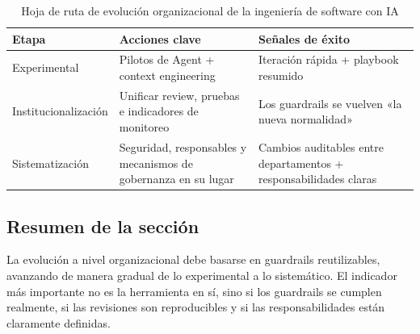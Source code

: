 \begin{table}[H]
\centering
\begin{tabular}{p{} p{} p{}}
\toprule
Etapa & Acciones clave & Señales de éxito \\
\midrule
Experimental & Pilotos de Agent + context engineering & Iteración rápida + playbook resumido \\
Institucionalización & Unificar review, pruebas e indicadores de monitoreo & Los guardrails se vuelven «la nueva normalidad» \\
Sistematización & Seguridad, responsables y mecanismos de gobernanza en su lugar & Cambios auditables entre departamentos + responsabilidades claras \\
\bottomrule
\end{tabular}
\caption{Hoja de ruta de evolución organizacional de la ingeniería de software con IA}
\end{table}

\subsection{Resumen de la sección}

La evolución a nivel organizacional debe basarse en guardrails reutilizables, avanzando de manera gradual de lo experimental a lo sistemático. El indicador más importante no es la herramienta en sí, sino si los guardrails se cumplen realmente, si las revisiones son reproducibles y si las responsabilidades están claramente definidas.
